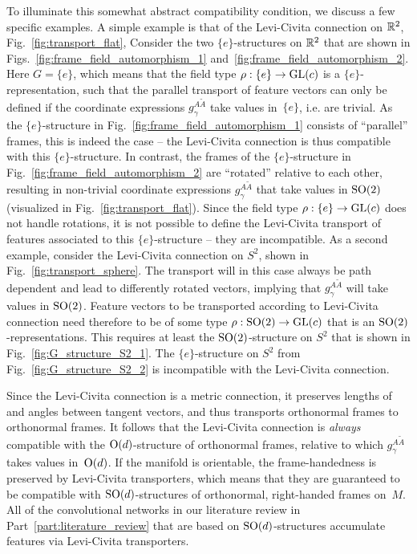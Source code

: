 To illuminate this somewhat abstract compatibility condition, we discuss a few specific examples.
A simple example is that of the Levi-Civita connection on $\mathbb{R}^2$, Fig.~\ref{fig:transport_flat}, 
Consider the two $\{e\}$-structures on $\mathbb{R}^2$ that are shown in Figs.~\ref{fig:frame_field_automorphism_1} and~\ref{fig:frame_field_automorphism_2}.
Here $G=\{e\}$, which means that the field type $\rho: \{e\} \to \operatorname{GL}(c)$ is a $\{e\}$-representation, such that the parallel transport of feature vectors can only be defined if the coordinate expressions $g_\gamma^{A\widetilde{A}}$ take values in~$\{e\}$, i.e. are trivial.
As the $\{e\}$-structure in Fig.~\ref{fig:frame_field_automorphism_1} consists of ``parallel'' frames, this is indeed the case -- the Levi-Civita connection is thus compatible with this $\{e\}$-structure.
In contrast, the frames of the $\{e\}$-structure in Fig.~\ref{fig:frame_field_automorphism_2} are ``rotated'' relative to each other, resulting in non-trivial coordinate expressions $g_\gamma^{A\widetilde{A}}$ that take values in $\operatorname{SO}(2)$ (visualized in Fig.~\ref{fig:transport_flat}).
Since the field type $\rho: \{e\} \to \operatorname{GL}(c)$ does not handle rotations, it is not possible to define the Levi-Civita transport of features associated to this $\{e\}$-structure -- they are incompatible.
As a second example, consider the Levi-Civita connection on $S^2$, shown in Fig.~\ref{fig:transport_sphere}.
The transport will in this case always be path dependent and lead to differently rotated vectors, implying that $g_\gamma^{A\widetilde{A}}$ will take values in $\operatorname{SO}(2)$.
Feature vectors to be transported according to Levi-Civita connection need therefore to be of some type $\rho: \operatorname{SO}(2) \to \operatorname{GL}(c)$ that is an $\operatorname{SO}(2)$-representations.
This requires at least the $\operatorname{SO}(2)$-structure on $S^2$ that is shown in Fig.~\ref{fig:G_structure_S2_1}.
The $\{e\}$-structure on $S^2$ from Fig.~\ref{fig:G_structure_S2_2} is incompatible with the Levi-Civita connection.


Since the Levi-Civita connection is a metric connection, it preserves lengths of and angles between tangent vectors, and thus transports orthonormal frames to orthonormal frames.
It follows that the Levi-Civita connection is \emph{always} compatible with the $\operatorname{O}(d)$-structure of orthonormal frames, relative to which $g_\gamma^{A\widetilde{A}}$ takes values in~$\operatorname{O}(d)$.
If the manifold is orientable, the frame-handedness is preserved by Levi-Civita transporters, which means that they are guaranteed to be compatible with $\operatorname{SO}(d)$-structures of orthonormal, right-handed frames on~$M$.
All of the convolutional networks in our literature review in Part~\ref{part:literature_review} that are based on $\operatorname{SO}(d)$-structures accumulate features via Levi-Civita transporters.


